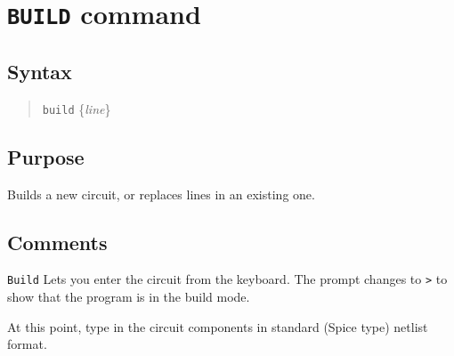 %
%
%
%
\section{{\tt BUILD} command}
\subsection{Syntax}
\begin{verse}
{\tt build} \{{\it line}\}
\end{verse}
\subsection{Purpose}

Builds a new circuit, or replaces lines in an existing one.
\subsection{Comments}

{\tt Build} Lets you enter the circuit from the keyboard.  The prompt changes 
to {\tt >} to show that the program is in the build mode.

At this point, type in the circuit components in standard (Spice type)
netlist format.

